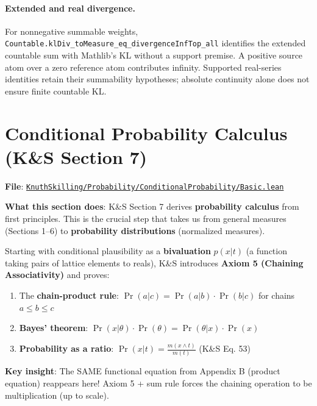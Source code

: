 \documentclass[11pt]{article}
\theoremstyle{definition}
\theoremstyle{remark}
\begin{document}
\paragraph{Extended and real divergence.}
For nonnegative summable weights, \texttt{Countable.klDiv\_toMeasure\_eq\_divergenceInfTop\_all}
identifies the extended countable sum with Mathlib's KL without a support premise.
A positive source atom over a zero reference atom contributes infinity.
Supported real-series identities retain their summability hypotheses;
absolute continuity alone does not ensure finite countable KL.

\section{Conditional Probability Calculus (K\&S Section 7)}

\textbf{File}: \href{https://github.com/zariuq/ks-foundations-of-inference/blob/main/KnuthSkilling/Probability/ConditionalProbability/Basic.lean}{\texttt{KnuthSkilling/Probability/ConditionalProbability/Basic.lean}}

\textbf{What this section does}: K\&S Section 7 derives \textbf{probability calculus} from first principles. This is the crucial step that takes us from general measures (Sections 1--6) to \textbf{probability distributions} (normalized measures).

Starting with conditional plausibility as a \textbf{bivaluation} $p(x|t)$ (a function taking pairs of lattice elements to reals), K\&S introduces \textbf{Axiom 5 (Chaining Associativity)} and proves:

\begin{enumerate}
\item The \textbf{chain-product rule}: $\Pr(a|c) = \Pr(a|b) \cdot \Pr(b|c)$ for chains $a \leq b \leq c$
\item \textbf{Bayes' theorem}: $\Pr(x|\theta) \cdot \Pr(\theta) = \Pr(\theta|x) \cdot \Pr(x)$
\item \textbf{Probability as a ratio}: $\Pr(x|t) = \frac{m(x \wedge t)}{m(t)}$ (K\&S Eq. 53)
\end{enumerate}

\textbf{Key insight}: The SAME functional equation from Appendix B (product equation) reappears here! Axiom 5 + sum rule forces the chaining operation to be multiplication (up to scale).
\end{document}
